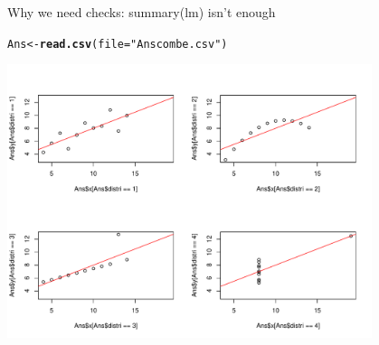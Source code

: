 \documentclass[10pt]{beamer}\usepackage[]{graphicx}\usepackage[]{color}
\makeatletter
\newcommand{\hlstr}[1]{\textcolor[rgb]{0.192,0.494,0.8}{#1}}%
\newcommand{\hlstd}[1]{\textcolor[rgb]{0.345,0.345,0.345}{#1}}%
\newcommand{\hlkwb}[1]{\textcolor[rgb]{0.69,0.353,0.396}{#1}}%
\newcommand{\hlkwc}[1]{\textcolor[rgb]{0.333,0.667,0.333}{#1}}%
\newcommand{\hlkwd}[1]{\textcolor[rgb]{0.737,0.353,0.396}{\textbf{#1}}}%
\newenvironment{kframe}{%
 \def\at@end@of@kframe{}%
 \ifinner\ifhmode%
  \def\at@end@of@kframe{\end{minipage}}%
  \begin{minipage}{\columnwidth}%
 \fi\fi%
 \def\FrameCommand##1{\hskip\@totalleftmargin \hskip-\fboxsep
 \colorbox{shadecolor}{##1}\hskip-\fboxsep
     \hskip-\linewidth \hskip-\@totalleftmargin \hskip\columnwidth}%
 \MakeFramed {\advance\hsize-\width
   \@totalleftmargin\z@ \linewidth\hsize
   \@setminipage}}%
 {\par\unskip\endMakeFramed%
 \at@end@of@kframe}
\newenvironment{knitrout}{}{} %
\makeatother
\begin{document}
\begin{frame}[fragile]{Why we need checks: summary(lm) isn't enough}

\begin{knitrout}\small
{}\color{fgcolor}\begin{kframe}
\begin{alltt}
  \hlstd{Ans} \hlkwb{<-} \hlkwd{read.csv}\hlstd{(}\hlkwc{file} \hlstd{=} \hlstr{"Anscombe.csv"}\hlstd{)}
\end{alltt}
\end{kframe}
\end{knitrout}
  
\begin{knitrout}\small
{}\color{fgcolor}
\includegraphics[width=0.8\textwidth,height=0.6\textwidth]{figure/anscombe-1} 

\end{knitrout}
\end{frame}
\end{document}
